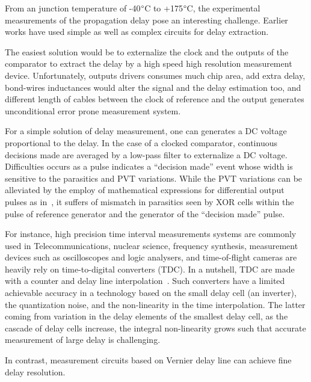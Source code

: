 From an junction temperature of -40\(\degree \)C to +175\(\degree \)C, the experimental measurements of the propagation delay pose an interesting challenge. Earlier works have used simple as well as complex circuits for delay extraction. 

The easiest solution would be to externalize the clock and the outputs of the comparator to extract the delay by a high speed high resolution measurement device. Unfortunately, outputs drivers consumes much chip area, add extra delay, bond-wires inductances would alter the signal and the delay estimation too, and different length of cables between the clock of reference and the output generates unconditional error prone measurement system.

For a simple solution of delay measurement, one can generates a DC voltage proportional to the delay. In the case of a clocked comparator, continuous decisions made are averaged by a low-pass filter to externalize a DC voltage. Difficulties occurs as a pulse indicates a ``decision made'' event whose width is sensitive to the parasitics and PVT variations. While the PVT variations can be alleviated by the employ of mathematical expressions for differential output pulses as in~\cite{1706643}, it suffers of mismatch in parasitics seen by XOR cells within the pulse of reference generator and the generator of the ``decision made'' pulse.

For instance, high precision time interval measurements systems are commonly used in Telecommunications, nuclear science, frequency synthesis, measurement devices such as oscilloscopes and logic analysers, and time-of-flight cameras are heavily rely on time-to-digital converters (TDC). In a nutshell, TDC are made with a counter and delay line interpolation~\cite{1637593}. Such converters have a limited achievable accuracy in a technology based on the small delay cell (an inverter), the quantization noise, and the non-linearity in the time interpolation. The latter coming from variation in the delay elements of the smallest delay cell, as the cascade of delay cells increase, the integral non-linearity grows such that accurate measurement of large delay is challenging.

In contrast, measurement circuits based on Vernier delay line can achieve fine delay resolution.

